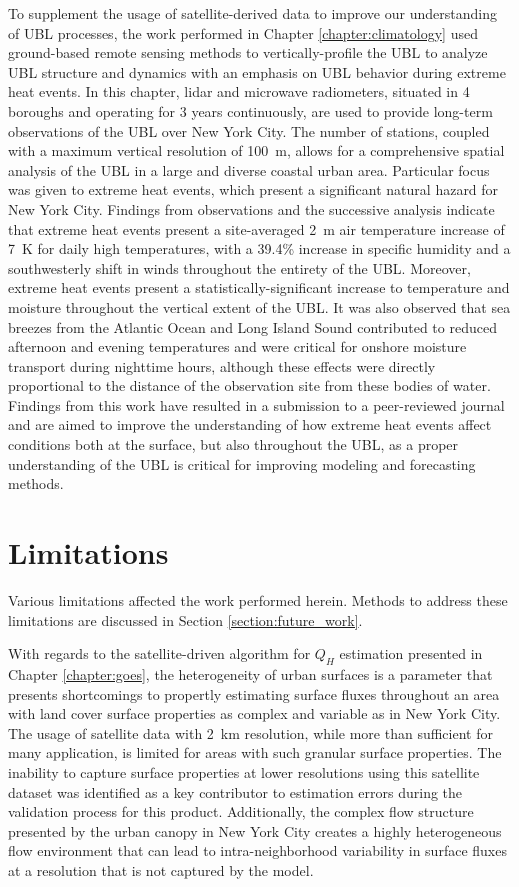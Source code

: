 To supplement the usage of satellite-derived data to improve our understanding of UBL processes, the work performed in Chapter \ref{chapter:climatology} used ground-based remote sensing methods to vertically-profile the UBL to analyze UBL structure and dynamics with an emphasis on UBL behavior during extreme heat events. In this chapter, lidar and microwave radiometers, situated in 4 boroughs and operating for 3 years continuously, are used to provide long-term observations of the UBL over New York City. The number of stations, coupled with a maximum vertical resolution of \SI{100}{\meter}, allows for a comprehensive spatial analysis of the UBL in a large and diverse coastal urban area. Particular focus was given to extreme heat events, which present a significant natural hazard for New York City. Findings from observations and the successive analysis indicate that extreme heat events present a site-averaged \SI{2}{\meter} air temperature increase of \SI{7}{K} for daily high temperatures, with a 39.4\% increase in specific humidity and a southwesterly shift in winds throughout the entirety of the UBL. Moreover, extreme heat events present a statistically-significant increase to temperature and moisture throughout the vertical extent of the UBL. It was also observed that sea breezes from the Atlantic Ocean and Long Island Sound contributed to reduced afternoon and evening temperatures and were critical for onshore moisture transport during nighttime hours, although these effects were directly proportional to the distance of the observation site from these bodies of water. Findings from this work have resulted in a submission to a peer-reviewed journal and are aimed to improve the understanding of how extreme heat events affect conditions both at the surface, but also throughout the UBL, as a proper understanding of the UBL is critical for improving modeling and forecasting methods.

\section{Limitations}\label{section:limitations}

Various limitations affected the work performed herein. Methods to address these limitations are discussed in Section \ref{section:future_work}. 

With regards to the satellite-driven algorithm for $Q_H$ estimation presented in Chapter \ref{chapter:goes}, the heterogeneity of urban surfaces is a parameter that presents shortcomings to propertly estimating surface fluxes throughout an area with land cover surface properties as complex and variable as in New York City. The usage of satellite data with \SI{2}{\kilo\meter} resolution, while more than sufficient for many application, is limited for areas with such granular surface properties. The inability to capture surface properties at lower resolutions using this satellite dataset was identified as a key contributor to estimation errors during the validation process for this product. Additionally, the complex flow structure presented by the urban canopy in New York City creates a highly heterogeneous flow environment that can lead to intra-neighborhood variability in surface fluxes at a resolution that is not captured by the model. 


